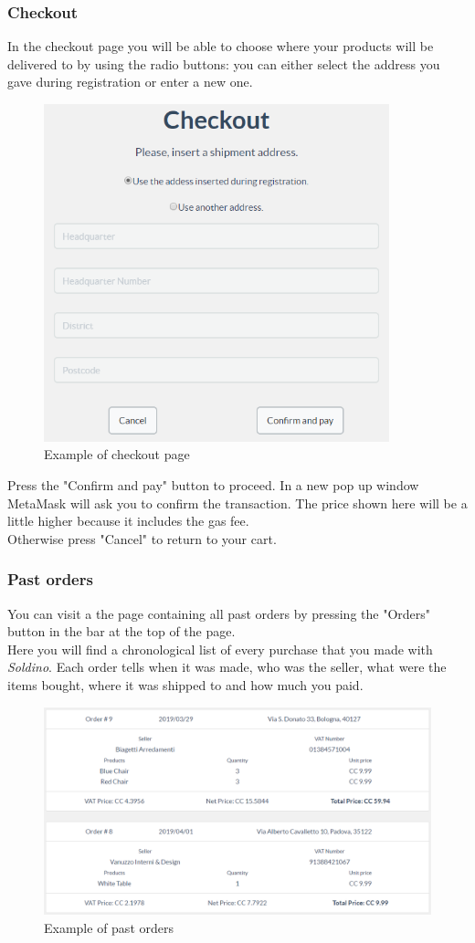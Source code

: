 	\subsubsection{Checkout}
	In the checkout page you will be able to choose where your products will be 
	delivered to by using the radio buttons: you can either select the address you 
	gave during registration or enter a new one.\\
	\begin{figure}[H]
		\includegraphics[width=10cm]{res/images/checkout.png}
		\centering
		\caption{Example of checkout page}
	\end{figure}
	\noindent Press the "Confirm and pay" button to proceed. In a new 
	pop up window MetaMask will ask you to confirm the transaction. The price 
	shown here will be a little higher because it includes the gas fee. \\
	Otherwise press "Cancel" to return to your cart.
	\subsubsection{Past orders}
	You can visit a the page containing all past orders by pressing the "Orders" 
	button in the bar at the top of the page.\\
	Here you will find a chronological list of every purchase that you made with 
	\textit{Soldino}. Each order tells when it was made, who was the seller, 
	what were the items bought, where it was shipped to and how much you paid.
	\begin{figure}[H]
		\includegraphics[width=15cm]{res/images/past_orders.png}
		\centering
		\caption{Example of past orders}
	\end{figure}